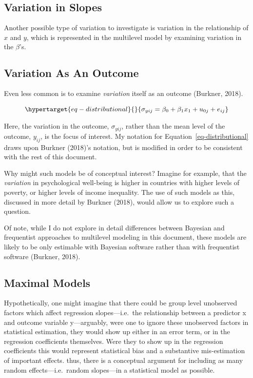 \documentclass[
  letterpaper,
  DIV=11,
  numbers=noendperiod]{scrreprt}
\begin{document}
\hypertarget{variation-in-slopes}{%
\subsection{Variation in Slopes}\label{variation-in-slopes}}

Another possible type of variation to investigate is variation in the
relationship of \(x\) and \(y\), which is represented in the multilevel
model by examining variation in the \(\beta\)'s.

\hypertarget{variation-as-an-outcome}{%
\subsection{Variation As An Outcome}\label{variation-as-an-outcome}}

Even less common is to examine \emph{variation} itself as an outcome
(Burkner, 2018).

\begin{equation}\protect\hypertarget{eq-distributional}{}{\sigma_{yij} = \beta_0 + \beta_1 x_1 + u_{0j} + e_{ij}}\label{eq-distributional}\end{equation}

Here, the variation in the outcome, \(\sigma_{yij}\), rather than the
mean level of the outcome, \(y_{ij}\), is the focus of interest. My
notation for Equation~\ref{eq-distributional} draws upon Burkner
(2018)'s notation, but is modified in order to be consistent with the
rest of this document.

Why might such models be of conceptual interest? Imagine for example,
that the \emph{variation} in psychological well-being is higher in
countries with higher levels of poverty, or higher levels of income
inequality. The use of such models as this, discussed in more detail by
Burkner (2018), would allow us to explore such a question.

Of note, while I do not explore in detail differences between Bayesian
and frequentist approaches to multilevel modeling in this document,
these models are likely to be only estimable with Bayesian software
rather than with frequentist software (Burkner, 2018).

\hypertarget{maximal-models}{%
\subsection{Maximal Models}\label{maximal-models}}

Hypothetically, one might imagine that there could be group level
unobserved factors which affect regression slopes---i.e.~the
relationship between a predictor x and outcome variable y---arguably,
were one to ignore these unobserved factors in statistical estimation,
they would show up either in an error term, or in the regression
coefficients themselves. Were they to show up in the regression
coefficients this would represent statistical bias and a substantive
mis-estimation of important effects. thus, there is a conceptual
argument for including as many random effects---i.e.~random slopes---in
a statistical model as possible.
\end{document}
